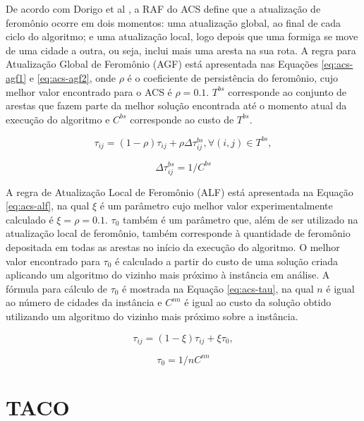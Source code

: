 De acordo com Dorigo et al \cite{dorigo2008particle}, a RAF do ACS define que a atualização de feromônio ocorre em dois momentos: uma atualização global, ao final de cada ciclo do algoritmo; e uma atualização local, logo depois que uma formiga se move de uma cidade a outra, ou seja, inclui mais uma aresta na sua rota. A regra para Atualização Global de Feromônio (AGF) está apresentada nas Equações \ref{eq:acs-agf1} e \ref{eq:acs-agf2}, onde $\rho$ é o coeficiente de persistência do feromônio, cujo melhor valor encontrado para o ACS é $\rho = 0.1$. $T^{bs}$ corresponde ao conjunto de arestas que fazem parte da melhor solução encontrada até o momento atual da execução do algoritmo e $C^{bs}$ corresponde ao custo de $T^{bs}$.

\begin{equation} \label{eq:acs-agf1} 
    \tau_{ij} = (1 - \rho)\tau_{ij} + \rho\Delta\tau_{ij}^{bs}, \forall (i,j) \in T^{bs}, 
\end{equation}

\begin{equation} \label{eq:acs-agf2} 
    \Delta\tau_{ij}^{bs} = 1/C^{bs}
\end{equation}

A regra de Atualização Local de Feromônio (ALF) \cite{dorigo2008particle} está apresentada na Equação \ref{eq:acs-alf}, na qual $\xi$ é um parâmetro cujo melhor valor experimentalmente calculado é $\xi = \rho = 0.1$. $\tau_0$ também é um parâmetro que, além de ser utilizado na atualização local de feromônio, também corresponde à quantidade de feromônio depositada em todas as arestas no início da execução do algoritmo. O melhor valor encontrado para $\tau_0$ é calculado a partir do custo de uma solução criada aplicando um algoritmo do vizinho mais próximo à instância em análise. A fórmula para cálculo de $\tau_0$ é mostrada na Equação \ref{eq:acs-tau}, na qual $n$ é igual ao número de cidades da instância e $C^{nn}$ é igual ao custo da solução obtido utilizando um algoritmo do vizinho mais próximo sobre a instância.

\begin{equation} \label{eq:acs-alf} 
    \tau_{ij} = (1 - \xi)\tau_{ij} + \xi\tau_0,
\end{equation}

\begin{equation} \label{eq:acs-tau} 
    \tau_0 = 1/nC^{nn}
\end{equation}

\section{TACO}
\label{sec-taco}

